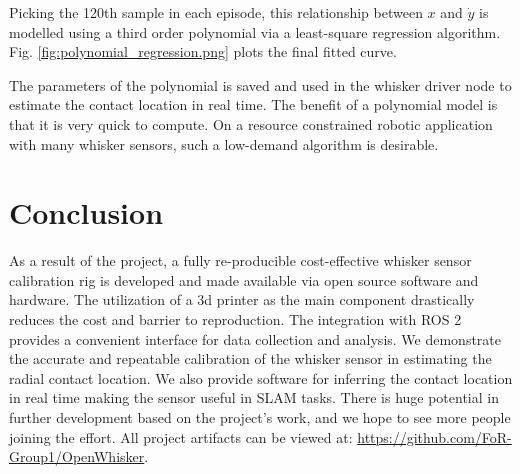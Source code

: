 \documentclass[runningheads]{llncs}
\begin{document}
Picking the 120th sample in each episode, this relationship between \(x\) and \(\dot{y}\) is modelled using a third order polynomial via a least-square regression algorithm. Fig. \ref*{fig:polynomial_regression.png} plots the final fitted curve.

The parameters of the polynomial is saved and used in the whisker driver node to estimate the contact location in real time. The benefit of a polynomial model is that it is very quick to compute. On a resource constrained robotic application with many whisker sensors, such a low-demand algorithm is desirable.

\section{Conclusion}

As a result of the project, a fully re-producible cost-effective whisker sensor calibration rig is developed and made available via open source software and hardware. The utilization of a 3d printer as the main component drastically reduces the cost and barrier to reproduction. The integration with ROS 2 provides a convenient interface for data collection and analysis. We demonstrate the accurate and repeatable calibration of the whisker sensor in estimating the radial contact location. We also provide software for inferring the contact location in real time making the sensor useful in SLAM tasks. There is huge potential in further development based on the project's work, and we hope to see more people joining the effort. All project artifacts can be viewed at: \url{https://github.com/FoR-Group1/OpenWhisker}.


\end{document}
